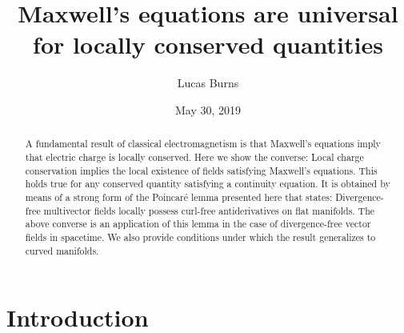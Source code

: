\documentclass[twocolumn,notitlepage,nofootinbib,tightenlines]{revtex4-1}
\theoremstyle{definition}
\theoremstyle{remark}
\numberwithin{equation}{section}
\begin{document}
\title{Maxwell's equations are universal\\ for locally conserved quantities}

\author{Lucas Burns}
\address{Chapman University}
\date{\small May 30, 2019}

\begin{abstract}
A fundamental result of classical electromagnetism is that Maxwell's equations imply that electric charge  is  locally  conserved.  Here  we  show the converse: Local  charge  conservation  implies  the local existence of fields satisfying Maxwell's equations. This holds true for any conserved quantity satisfying a continuity equation. It is obtained by means of a strong form of the Poincar\'e lemma presented here that states: Divergence-free multivector fields locally possess curl-free antiderivatives on flat manifolds. The above converse is an application of this lemma in the case of divergence-free vector fields in spacetime. We also provide conditions under which the result generalizes to curved manifolds.
\end{abstract}

\maketitle

\section{Introduction}
\end{document}
